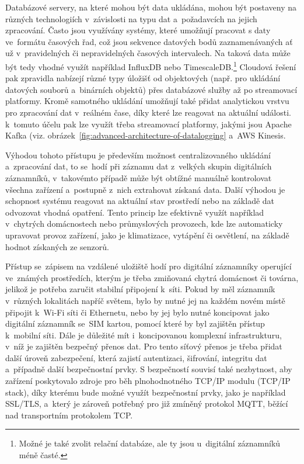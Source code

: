 
Databázové servery, na které mohou být data ukládána, mohou být postaveny na různých technologiích v~závislosti na typu dat a~požadavcích na jejich zpracování. Často jsou využívány systémy, které umožňují pracovat s daty ve~formátu časových řad, což jsou sekvence datových bodů zaznamenávaných ať už v~pravidelných či nepravidelných časových intervalech. Na taková data může být tedy vhodné využít například InfluxDB nebo TimescaleDB.\footnote{Možné je také zvolit relační databáze, ale ty jsou u~digitální záznamníků méně časté.} Cloudová řešení pak zpravidla nabízejí různé typy úložišť od objektových (např. pro ukládání datových souborů a~binárních objektů) přes databázové služby až po streamovací platformy. Kromě samotného ukládání umožňují také přidat analytickou vrstvu pro zpracování dat v~reálném čase, díky které lze reagovat na aktuální události. k~tomuto účelu pak lze využít třeba streamovací platformy, jakými jsou Apache Kafka (viz. obrázek~\ref{fig:advanced-architecture-of-datalogging} a~AWS Kinesis.~\cite{springer_analysis_time_series_db_edge_computing}

Výhodou tohoto přístupu je především možnost centralizovaného ukládání a~zpracování dat, to se~hodí při záznamu dat z~velkých skupin digitálních záznamníků, v~takovémto případě může být obtížné manuálně kontrolovat všechna zařízení a~postupně z~nich extrahovat získaná data. Další výhodou je schopnost systému reagovat na aktuální stav prostředí nebo na základě dat odvozovat vhodná opatření. Tento princip lze efektivně využít například v~chytrých domácnostech nebo průmyslových provozech, kde lze automaticky upravovat provoz zařízení, jako je klimatizace, vytápění či osvětlení, na základě hodnot získaných ze senzorů.~\cite{springer_analysis_time_series_db_edge_computing, iot_datalogger_with_timestamping, researchgate_general_dataloggger_multiple_sdcards}

Přístup se~zápisem na vzdálené uložiště hodí pro digitální záznamníky operující ve~známých prostředích, kterým je třeba zmiňovaná chytrá domácnost či továrna, jelikož je potřeba zaručit stabilní připojení k~síti. Pokud by měl záznamník v~různých lokalitách napříč světem, bylo by nutné jej na každém novém místě připojit k~Wi-Fi síti či Ethernetu, nebo by jej bylo nutné koncipovat jako digitální záznamník se~SIM kartou, pomocí které by byl zajištěn přístup k~mobilní síti. Dále je důležité mít i~koncipovanou komplexní infrastrukturu, v~níž je zajištěn bezpečný přenos dat. Pro tento síťový přenos je třeba přidat další úroveň zabezpečení, která zajistí autentizaci, šifrování, integritu dat a~případně další bezpečnostní prvky. S bezpečností souvisí také nezbytnost, aby zařízení poskytovalo zdroje pro běh plnohodnotného TCP/IP modulu (TCP/IP stack), díky kterému bude možné využít bezpečnostní prvky, jako je například SSL/TLS, a~který je zároveň potřebný pro již zmíněný protokol MQTT, běžící nad transportním protokolem TCP.~\cite{springer_analysis_time_series_db_edge_computing, iot_datalogger_with_timestamping, researchgate_general_dataloggger_multiple_sdcards, iot_threats}


